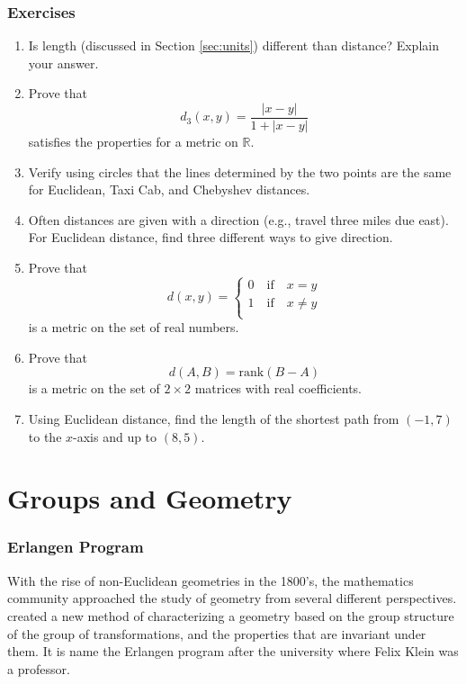 \documentclass[
]{book}
\theoremstyle{definition}
\theoremstyle{definition}
\theoremstyle{definition}
\theoremstyle{definition}
\theoremstyle{remark}
\begin{document}
\hypertarget{exercises-46}{%
\subsection{Exercises}\label{exercises-46}}

\begin{enumerate}
\def\labelenumi{\arabic{enumi}.}
\item
  Is length (discussed in Section \ref{sec:units}) different than distance? Explain your answer.
\item
  Prove that \[d_3(x,y) = \frac{|x-y|}{1+|x-y|}\] satisfies the properties for a metric on \(\mathbb{R}\).
\item
  Verify using circles that the lines determined by the two points are the same for Euclidean, Taxi Cab, and Chebyshev distances.
\item
  Often distances are given with a direction (e.g., travel three miles due east). For Euclidean distance, find three different ways to give direction.
\item
  Prove that \[d(x,y)= \left\{ \begin{array}{l}
  0 \quad \mbox{if} \quad x=y \\
  1 \quad \mbox{if} \quad x\neq y\\
  \end{array} \right.\]
  is a metric on the set of real numbers.
\item
  Prove that \[d(A,B)=\mbox{rank} (B-A)\] is a metric on the set of \(2\times 2\) matrices with real coefficients.
\item
  Using Euclidean distance, find the length of the shortest path from \((-1,7)\) to the \(x\)-axis and up to \((8,5)\).
\end{enumerate}

\hypertarget{ch:algebraic-geometry}{%
\chapter{Groups and Geometry}\label{ch:algebraic-geometry}}

\hypertarget{erlangen-program}{%
\subsection*{Erlangen Program}\label{erlangen-program}}

With the rise of non-Euclidean geometries in the 1800's, the mathematics community approached the study of geometry from several different perspectives. \citet{Klein1872} created a new method of characterizing a geometry based on the group structure of the group of transformations, and the properties that are invariant under them. It is name the Erlangen program after the university where Felix Klein was a professor.
\end{document}
